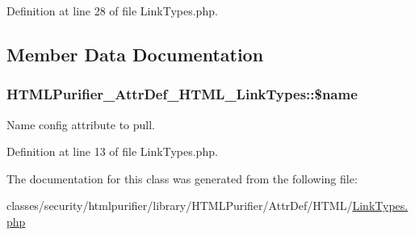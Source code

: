 Definition at line 28 of file Link\+Types.\+php.



\subsection{Member Data Documentation}
\hypertarget{classHTMLPurifier__AttrDef__HTML__LinkTypes_a0b1b0d672fe9e3ee3fe23472243b1bf9}{
\subsubsection[{\$name}]{\setlength{\rightskip}{0pt plus 5cm}H\+T\+M\+L\+Purifier\+\_\+\+Attr\+Def\+\_\+\+H\+T\+M\+L\+\_\+\+Link\+Types\+::\$name\hspace{0.3cm}{\ttfamily [protected]}}}\label{classHTMLPurifier__AttrDef__HTML__LinkTypes_a0b1b0d672fe9e3ee3fe23472243b1bf9}
Name config attribute to pull. 

Definition at line 13 of file Link\+Types.\+php.



The documentation for this class was generated from the following file\+:\begin{DoxyCompactItemize}
\item 
classes/security/htmlpurifier/library/\+H\+T\+M\+L\+Purifier/\+Attr\+Def/\+H\+T\+M\+L/\hyperlink{LinkTypes_8php}{Link\+Types.\+php}\end{DoxyCompactItemize}
